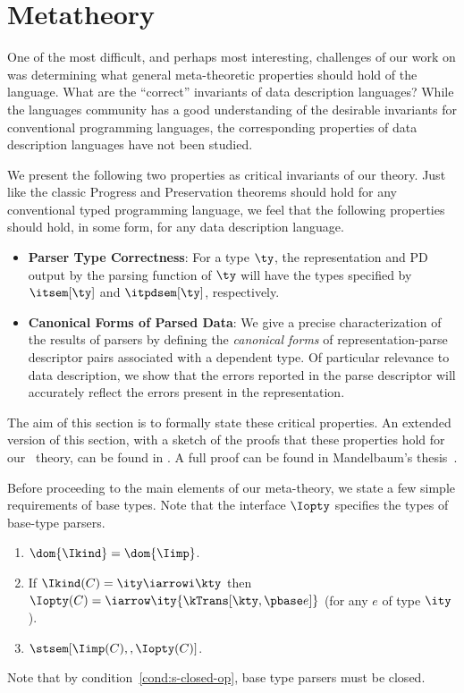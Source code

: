 \section{Metatheory}
\label{sec:ddc-meta-theory}

One of the most difficult, and perhaps most interesting, challenges of our
work on \ddc{} was determining what general
meta-theoretic properties should hold of the language. What are the ``correct''
invariants of data description languages?  While the languages
community has a good understanding of the
desirable invariants for conventional programming languages, the
corresponding properties of data description languages have not been
studied.

We present the following two properties as critical invariants of
our theory.  Just like the classic Progress and Preservation theorems
should hold for any conventional typed programming language,
we feel that the following properties should hold, in some form, for any data
description language.
\begin{itemize}
\item {\bf Parser Type Correctness}: For a \ddc{} type $\ty$, the
  representation and PD output by the parsing function of $\ty$ will
  have the types specified by $\itsem[\ty]$ and
  $\itpdsem[\ty]$, respectively.
  
\item {\bf Canonical Forms of Parsed Data}: We give a precise
  characterization of the results of parsers by defining the {\em
    canonical forms} of representation-parse descriptor pairs
  associated with a dependent \ddc{} type. Of particular relevance to
  data description, we show that the errors reported in the parse
  descriptor will accurately reflect the errors present in the
  representation.
\end{itemize}
\noindent
The aim of this section is to formally state these
critical properties. An extended version of this section, with a sketch of the proofs that these properties hold for 
our \ddc\ theory, can be found in . A full proof can  be found in Mandelbaum's thesis~\cite{mandelbaum:thesis}. 

Before proceeding to the main elements of our meta-theory, 
we state a few simple requirements
of \ddc{} base types. Note that the interface $\Iopty$ specifies the types of base-type parsers.

\begin{condition}
\label{cond:s-base-types}
  \begin{enumerate}
  \item $\dom {\Ikind} = \dom {\Iimp}$.
  \item If $\Ikind(C) = {\ity \iarrowi \kty}$ then $\Iopty(C) =
    \iarrow \ity {\kTrans[\kty,\pbase e]}$ (for any $e$ of type $\ity$).
  \item $\stsem[\Iimp(C),,\Iopty(C)]$.
    \label{cond:s-closed-op}
  \end{enumerate}
\end{condition}
\noindent
Note that by
condition~\ref{cond:s-closed-op}, base type parsers must be closed.

